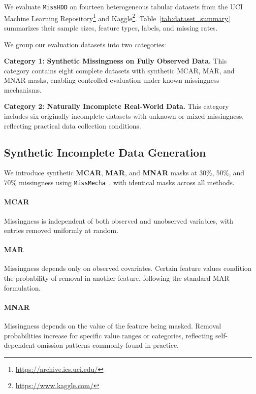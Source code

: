 \documentclass[times, review, 10pt]{elsarticle}
\newcommand{\DIFaddbegin}{\begingroup\color{blue}}
\newcommand{\DIFaddend}{\endgroup}
\begin{document}
\DIFaddbegin
We evaluate \texttt{MissHDD} on fourteen heterogeneous tabular datasets from
the UCI Machine Learning Repository\footnote{\url{https://archive.ics.uci.edu/}}
and Kaggle\footnote{\url{https://www.kaggle.com/}}. Table~\ref{tab:dataset_summary}
summarizes their sample sizes, feature types, labels, and missing rates.
\DIFaddend

We group our evaluation datasets into two categories:

\textbf{Category 1: Synthetic Missingness on Fully Observed Data.}
\DIFaddbegin
This category contains eight complete datasets with synthetic MCAR, MAR, and
MNAR masks, enabling controlled evaluation under known missingness mechanisms.
\DIFaddend

\textbf{Category 2: Naturally Incomplete Real-World Data.}
\DIFaddbegin
This category includes six originally incomplete datasets with unknown or mixed
missingness, reflecting practical data collection conditions.
\DIFaddend





\subsection{Synthetic Incomplete Data Generation}

\DIFaddbegin
We introduce synthetic \textbf{MCAR}, \textbf{MAR}, and \textbf{MNAR} masks at
30\%, 50\%, and 70\% missingness using \texttt{MissMecha}~\cite{missmecha},
with identical masks across all methods.
\DIFaddend

\paragraph*{MCAR}
Missingness is independent of both observed and unobserved variables, with
entries removed uniformly at random.

\paragraph*{MAR}
Missingness depends only on observed covariates. Certain feature values
condition the probability of removal in another feature, following the
standard MAR formulation.

\paragraph*{MNAR}
Missingness depends on the value of the feature being masked. Removal
probabilities increase for specific value ranges or categories, reflecting
self-dependent omission patterns commonly found in practice.
\end{document}
